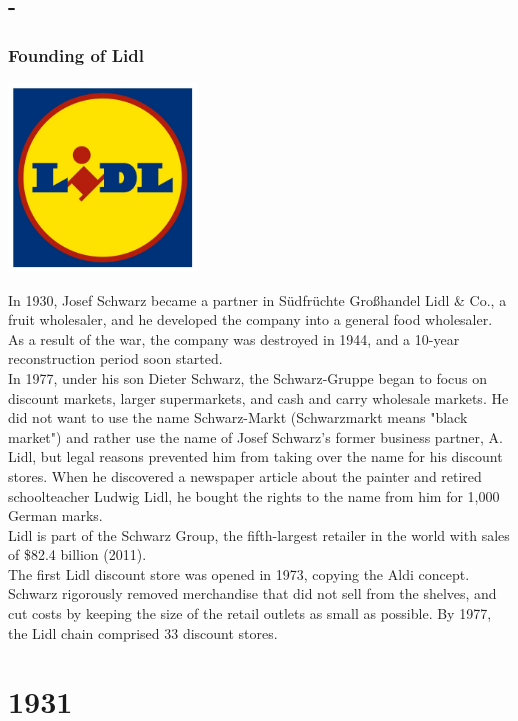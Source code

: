 \documentclass[11pt]{report}
\begin{document}
\section{-}
\subsection{Founding of Lidl}
\vspace{2mm}\begin{center}\includegraphics[width=5cm]{./img/lidlLogo.jpg}\end{center}
In 1930, Josef Schwarz became a partner in Südfrüchte Großhandel Lidl \& Co., a fruit wholesaler, and he developed the company into a general food wholesaler. As a result of the war, the company was destroyed in 1944, and a 10-year reconstruction period soon started.\\
\indent In 1977, under his son Dieter Schwarz, the Schwarz-Gruppe began to focus on discount markets, larger supermarkets, and cash and carry wholesale markets. He did not want to use the name Schwarz-Markt (Schwarzmarkt means "black market") and rather use the name of Josef Schwarz's former business partner, A. Lidl, but legal reasons prevented him from taking over the name for his discount stores. When he discovered a newspaper article about the painter and retired schoolteacher Ludwig Lidl, he bought the rights to the name from him for 1,000 German marks.\\
\indent Lidl is part of the Schwarz Group, the fifth-largest retailer in the world with sales of \$82.4 billion (2011).\\ \indent The first Lidl discount store was opened in 1973, copying the Aldi concept. Schwarz rigorously removed merchandise that did not sell from the shelves, and cut costs by keeping the size of the retail outlets as small as possible. By 1977, the Lidl chain comprised 33 discount stores.

\chapter{1931}
\end{document}
